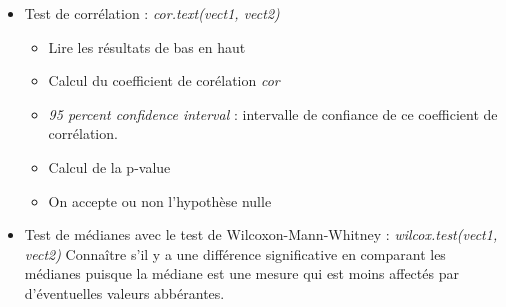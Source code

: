 \documentclass[12pt,a4paper]{article}
\begin{document}
\begin{itemize}
\item Test de corrélation : \textit{cor.text(vect1, vect2)}
\begin{itemize}
\item Lire les résultats de bas en haut
\item Calcul du coefficient de corélation \textit{cor}
\item \textit{95 percent confidence interval} : intervalle de confiance de ce coefficient de corrélation.
\item Calcul de la p-value
\item On accepte ou non l'hypothèse nulle
\end{itemize}
\item Test de médianes avec le test de Wilcoxon-Mann-Whitney : \textit{wilcox.test(vect1, vect2)}
\newline Connaître s'il y a une différence significative en comparant les médianes puisque la médiane est une mesure qui est moins affectés par d'éventuelles valeurs abbérantes.
\end{itemize}
\end{document}
